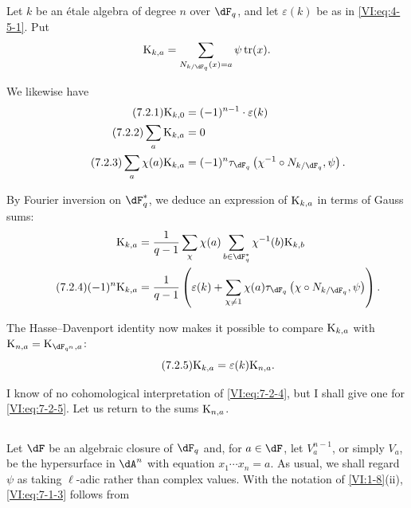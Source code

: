 \documentclass[oneside]{book}
\DeclareMathOperator{\tr}{tr}
\newcommand{\kloos}{\textnormal{K}} %
\theoremstyle{sga-source}
\theoremstyle{sga-source-dash}
\theoremstyle{sga-source-dotdash}
\theoremstyle{sga-source-number-note-dash}
\theoremstyle{sga-source-note-number-dotdash}
\theoremstyle{sga-source-example-dotdash}
\theoremstyle{sga-source-inline-number}
\theoremstyle{sga-source-bare-number}
\theoremstyle{sga-source}
\newcommand{\PrintPage}[1]{}\newcommand{\MathPage}[1]{}\newcommand{\PrintCite}[2]{#1}\newcommand{\var}[3]{#1}
\begin{document}
\subsection{}\label{VI:7-2}

Let $k$ be an étale algebra of degree $n$ over $\dF_q$, and let $\varepsilon(k)$ 
be as in \eqref{VI:eq:4-5-1}. Put 
\[
  \kloos_{k,a} = \sum_{N_{k/\dF_q}(x)=a} \psi \tr(x) \text{.} 
\]
\PrintPage{220}
We likewise have 
\begin{align*}\tag{7.2.1}\label{VI:eq:7-2-1}
  \kloos_{k,0} &= (-1)^{n-1} \cdot \varepsilon(k) \\ \tag{7.2.2}\label{VI:eq:7-2-2}
  \sum_a \kloos_{k,a} &= 0 \\ \tag{7.2.3}\label{VI:eq:7-2-3}
  \sum_a \chi(a) \kloos_{k,a} &= (-1)^n \tau_{\dF_q}\left(\chi^{-1}\circ N_{k/\dF_q},\psi\right) \text{.} 
\end{align*}

By Fourier inversion on $\dF_q^\ast$, we deduce an expression of 
$\kloos_{k,a}$ in terms of Gauss sums: 
\begin{align*} 
  \kloos_{k,a} &= \frac{1}{q-1} \sum_\chi \chi(a) \sum_{b\in \dF_q^\ast} \chi^{-1}(b) \kloos_{k,b} \\ \tag{7.2.4}\label{VI:eq:7-2-4}
  (-1)^n \kloos_{k,a} &= \frac{1}{q-1} \left(\varepsilon(k) + \sum_{\chi\ne 1} \chi(a) \tau_{\dF_q}\left(\chi\circ N_{k/\dF_q},\psi\right) \right) \text{.} 
\end{align*}

The Hasse--Davenport identity now makes it possible to compare $\kloos_{k,a}$ 
with $\kloos_{n,a} = \var{\kloos_{\dF_{q^n},a}}{\kloos_{\dF_q^n,a}}{S45-SOL-0934}$: 
\begin{equation*}\tag{7.2.5}\label{VI:eq:7-2-5}
  \kloos_{k,a} = \varepsilon(k) \kloos_{n,a} \text{.} 
\end{equation*}

I know of no cohomological interpretation of \eqref{VI:eq:7-2-4}, but 
I shall give one for \eqref{VI:eq:7-2-5}. Let us return to the sums $\kloos_{n,a}$. 





\subsection{}\label{VI:7-3}

Let $\dF$ be an algebraic closure of $\dF_q$ and, for $a\in \dF$, let 
$V_a^{n-1}$, or simply $V_a$, be the hypersurface in $\dA^n$ with equation 
$x_1 \dotsm x_n=a$. As usual, we shall regard $\psi$ as taking 
$\ell$-adic rather than complex values. With the notation of 
\ref{VI:1-8}(ii), \eqref{VI:eq:7-1-3} follows from 
\end{document}
